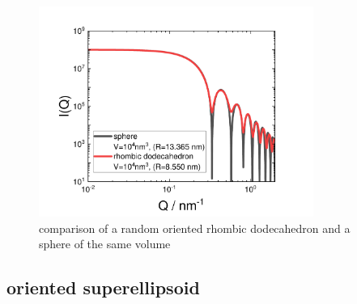 \begin{figure}[htb]
\begin{center}
\includegraphics[width=0.8\textwidth]{../images/form_factor/oriented_primitive_opbjects/RhombicDodecahedron.pdf}
\end{center}
\caption{comparison of a random oriented rhombic dodecahedron and a sphere of the same volume}
\label{fig:opo_rhombic_dodecahedron_IQ}
\end{figure}

\subsection{oriented superellipsoid} ~\\

